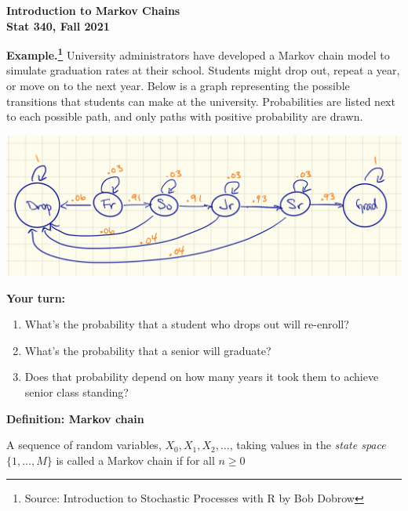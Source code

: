\documentclass[11pt]{article}\usepackage[]{graphicx}\usepackage[]{color}
\newenvironment{knitrout}{}{} %
\begin{document}
{\Large \bf Introduction to Markov Chains}\\[1ex]
{\large \bf Stat 340, Fall 2021}


{\bf Example.\footnote{Source: Introduction to Stochastic Processes with R by Bob Dobrow}}
University administrators have developed a Markov chain model to simulate graduation rates at their school. Students might drop out, repeat a year, or move on to the next year. Below is a graph representing the possible transitions that students can make at the university. Probabilities are listed next to each possible path, and only paths with positive probability are drawn.

\begin{knitrout}
\color{fgcolor}

{\centering \includegraphics[width=0.9\linewidth]{figs/graduation_mc} 

}


\end{knitrout}



{\bf Your turn:}

\begin{enumerate}

\item What's the probability that a student who drops out will re-enroll?\\[0.25in]

\item What's the probability that a senior will graduate?\\[0.25in]

\item Does that probability depend on how many years it took them to achieve senior class standing?\\[0.25in]

\end{enumerate}


{\bf Definition: Markov chain}

A sequence of random variables, $X_0, X_1, X_2, \ldots$, taking values in the \emph{state space} $\lbrace 1, \ldots, M \rbrace$ is called a Markov chain if for all $n \ge 0$\\[0.9in]
\end{document}
